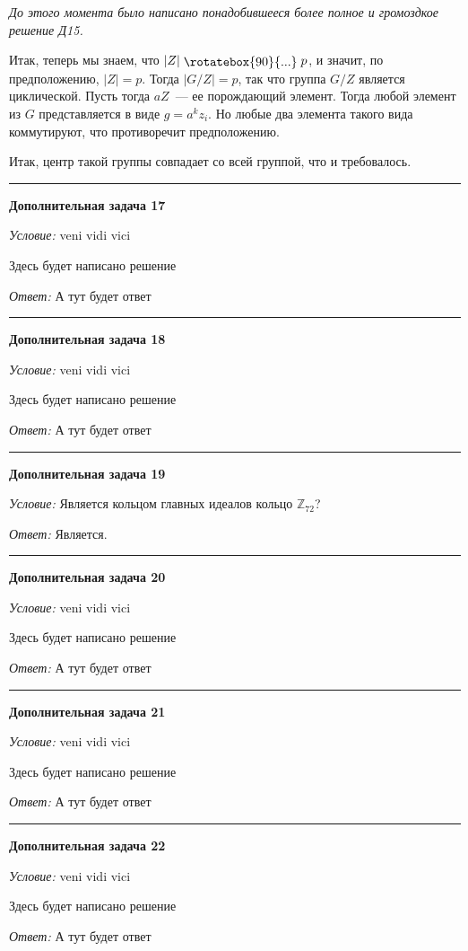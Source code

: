 \documentclass[12pt,a4paper]{article}
\newcommand{\divis}{\mathrel{\raisebox{-1pt}{\rotatebox{90}{...}}}}
\newcommand{\sbs}{\large \bfseries}
\newcommand{\rl}{\vspace{16pt} \hrule \vspace{8pt}}
\begin{document}
{\footnotesize \slshape До этого момента было написано понадобившееся более полное и громоздкое решение Д15.}

Итак, теперь мы знаем, что $|Z|\divis p$, и значит, по предположению, $|Z|=p$. Тогда $|G/Z|=p$, так что группа $G/Z$ является циклической. Пусть тогда $aZ$~--- ее порождающий элемент. Тогда любой элемент из $G$ представляется в виде $g = a^kz_i$. Но любые два элемента такого вида коммутируют, что противоречит предположению.

Итак, центр такой группы совпадает со всей группой, что и требовалось.




\rl
{\sbs Дополнительная задача 17}

{\itshape Условие: } veni vidi vici

Здесь будет написано решение

{\itshape Ответ: } А тут будет ответ




\rl
{\sbs Дополнительная задача 18}

{\itshape Условие: } veni vidi vici

Здесь будет написано решение

{\itshape Ответ: } А тут будет ответ




\rl
{\sbs Дополнительная задача 19}

{\itshape Условие: } Является кольцом главных идеалов кольцо $\mathds{Z}_{72}$?


{\itshape Ответ: } Является.




\rl
{\sbs Дополнительная задача 20}

{\itshape Условие: } veni vidi vici

Здесь будет написано решение

{\itshape Ответ: } А тут будет ответ




\rl
{\sbs Дополнительная задача 21}

{\itshape Условие: } veni vidi vici

Здесь будет написано решение

{\itshape Ответ: } А тут будет ответ




\rl
{\sbs Дополнительная задача 22}

{\itshape Условие: } veni vidi vici

Здесь будет написано решение

{\itshape Ответ: } А тут будет ответ
\end{document}
